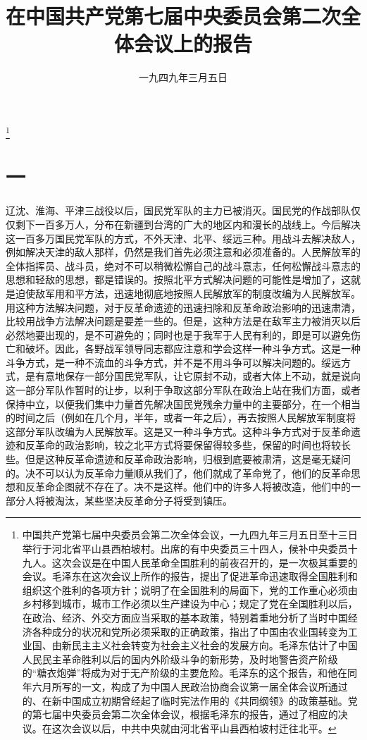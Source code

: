 

\title{在中国共产党第七届中央委员会第二次全体会议上的报告}
\date{一九四九年三月五日}
\thanks{中国共产党第七届中央委员会第二次全体会议，一九四九年三月五日至十三日举行于河北省平山县西柏坡村。出席的有中央委员三十四人，候补中央委员十九人。这次会议是在中国人民革命全国胜利的前夜召开的，是一次极其重要的会议。毛泽东在这次会议上所作的报告，提出了促进革命迅速取得全国胜利和组织这个胜利的各项方针；说明了在全国胜利的局面下，党的工作重心必须由乡村移到城市，城市工作必须以生产建设为中心；规定了党在全国胜利以后，在政治、经济、外交方面应当采取的基本政策，特别着重地分析了当时中国经济各种成分的状况和党所必须采取的正确政策，指出了中国由农业国转变为工业国、由新民主主义社会转变为社会主义社会的发展方向。毛泽东估计了中国人民民主革命胜利以后的国内外阶级斗争的新形势，及时地警告资产阶级的“糖衣炮弹”将成为对于无产阶级的主要危险。毛泽东的这个报告，和他在同年六月所写的一文，构成了为中国人民政治协商会议第一届全体会议所通过的、在新中国成立初期曾经起了临时宪法作用的《共同纲领》的政策基础。党的第七届中央委员会第二次全体会议，根据毛泽东的报告，通过了相应的决议。在这次会议以后，中共中央就由河北省平山县西柏坡村迁往北平。}
\maketitle


\section*{一}

辽沈、淮海、平津三战役以后，国民党军队的主力已被消灭。国民党的作战部队仅仅剩下一百多万人，分布在新疆到台湾的广大的地区内和漫长的战线上。今后解决这一百多万国民党军队的方式，不外天津、北平、绥远三种。用战斗去解决敌人，例如解决天津的敌人那样，仍然是我们首先必须注意和必须准备的。人民解放军的全体指挥员、战斗员，绝对不可以稍微松懈自己的战斗意志，任何松懈战斗意志的思想和轻敌的思想，都是错误的。按照北平方式解决问题的可能性是增加了，这就是迫使敌军用和平方法，迅速地彻底地按照人民解放军的制度改编为人民解放军。用这种方法解决问题，对于反革命遗迹的迅速扫除和反革命政治影响的迅速肃清，比较用战争方法解决问题是要差一些的。但是，这种方法是在敌军主力被消灭以后必然地要出现的，是不可避免的；同时也是于我军于人民有利的，即是可以避免伤亡和破坏。因此，各野战军领导同志都应注意和学会这样一种斗争方式。这是一种斗争方式，是一种不流血的斗争方式，并不是不用斗争可以解决问题的。绥远方式，是有意地保存一部分国民党军队，让它原封不动，或者大体上不动，就是说向这一部分军队作暂时的让步，以利于争取这部分军队在政治上站在我们方面，或者保持中立，以便我们集中力量首先解决国民党残余力量中的主要部分，在一个相当的时间之后（例如在几个月，半年，或者一年之后），再去按照人民解放军制度将这部分军队改编为人民解放军。这是又一种斗争方式。这种斗争方式对于反革命遗迹和反革命的政治影响，较之北平方式将要保留得较多些，保留的时间也将较长些。但是这种反革命遗迹和反革命政治影响，归根到底要被肃清，这是毫无疑问的。决不可以认为反革命力量顺从我们了，他们就成了革命党了，他们的反革命思想和反革命企图就不存在了。决不是这样。他们中的许多人将被改造，他们中的一部分人将被淘汰，某些坚决反革命分子将受到镇压。

